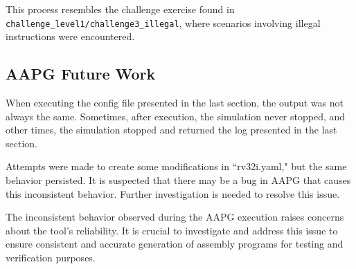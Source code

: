 This process resembles the challenge exercise found in \texttt{challenge\_level1/challenge3\_illegal}, where scenarios involving illegal instructions were encountered.

\subsection{AAPG Future Work}

When executing the config file presented in the last section, the output was not always the same. Sometimes, after execution, the simulation never stopped, and other times, the simulation stopped and returned the log presented in the last section.

Attempts were made to create some modifications in ``rv32i.yaml," but the same behavior persisted. It is suspected that there may be a bug in AAPG that causes this inconsistent behavior. Further investigation is needed to resolve this issue.

The inconsistent behavior observed during the AAPG execution raises concerns about the tool's reliability. It is crucial to investigate and address this issue to ensure consistent and accurate generation of assembly programs for testing and verification purposes.
